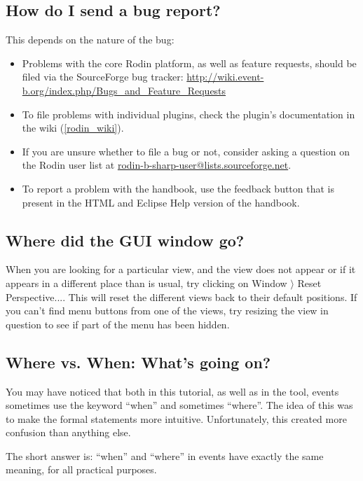 \subsection{How do I send a bug report?}
\label{bug_report}

This depends on the nature of the bug:
\begin{itemize}
	\item Problems with the core Rodin platform, as well as feature requests, should be filed via the SourceForge bug tracker: \url{http://wiki.event-b.org/index.php/Bugs_and_Feature_Requests}
	\item To file problems with individual plugins, check the plugin's documentation in the wiki (\ref{rodin_wiki}).
	\item If you are unsure whether to file a bug or not, consider asking a question on the Rodin user list at \href{mailto:rodin-b-sharp-user@lists.sourceforge.net}{rodin-b-sharp-user@lists.sourceforge.net}.
	\item To report a problem with the handbook, use the feedback button that is present in the HTML and Eclipse Help version of the handbook.
\end{itemize}

\subsection{Where did the GUI window go?}

When you are looking for a particular view, and the view does not appear or if it appears in a different place than is usual, try clicking on \textsf{Window $\rangle $ Reset Perspective...}. This will reset the different views back to their default positions. If you can't find menu buttons from one of the views, try resizing the view in question to see if part of the menu has been hidden.

\subsection{Where vs. When: What's going on?}

You may have noticed that both in this tutorial, as well as in the tool, events sometimes use the keyword ``when'' and sometimes ``where''.  The idea of this was to make the formal statements more intuitive.  Unfortunately, this created more confusion than anything else.

The short answer is: ``when'' and ``where'' in events have exactly the same meaning, for all practical purposes.

